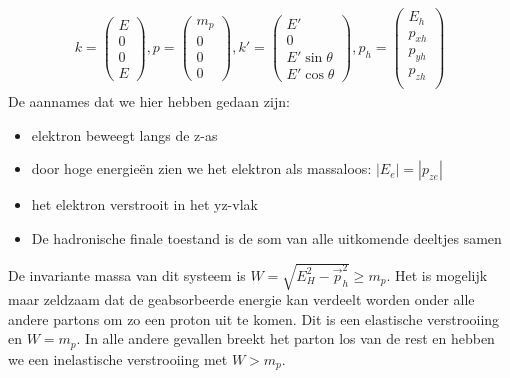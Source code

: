 \documentclass[../main.tex]{subfiles}
\begin{document}
\begin{equation}
    \begin{aligned}
        \label{eq:4_momenta_dis}
        k=
        \begin{pmatrix}
            E\\
            0\\
            0\\
            E
        \end{pmatrix},
        p=
        \begin{pmatrix}
            m_p\\
            0\\
            0\\
            0
        \end{pmatrix},
        k'=
        \begin{pmatrix}
            E'\\
            0\\
            E'\sin\theta\\
            E'\cos\theta
        \end{pmatrix},
        p_h=
        \begin{pmatrix}
            E_h\\
            p_{xh}\\
            p_{yh}\\
            p_{zh}\\
        \end{pmatrix}
    \end{aligned}
\end{equation}
De aannames dat we hier hebben gedaan zijn:
\begin{itemize}
    \item elektron beweegt langs de z-as
    \item door hoge energieën zien we het elektron als massaloos: $|E_e|=|p_{ze}|$
    \item het elektron verstrooit in het yz-vlak
    \item De hadronische finale toestand is de som van alle uitkomende deeltjes samen
\end{itemize}
De invariante massa van dit systeem is $W=\sqrt{E_H^2-\vec{p}^2_h}\geq m_p$. Het is mogelijk maar zeldzaam dat de geabsorbeerde energie kan verdeelt worden onder alle andere partons om zo een proton uit te komen. Dit is een elastische verstrooiing en $W=m_p$. In alle andere gevallen breekt het parton los van de rest en hebben we een inelastische verstrooiing met $W>m_p$.\\
\end{document}
